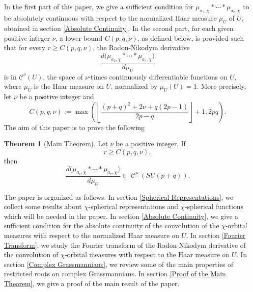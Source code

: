 \documentclass[11pt,a4paper]{amsart}
\DeclareMathOperator{\C}{\mathcal{C}}
\theoremstyle{definition}
\newtheorem*{theorem*}{Theorem}
\numberwithin{equation}{section}
\begin{document}
In the first part of this paper, we give a sufficient condition for $\mu_{a_1, \chi}\ast \cdots \ast \mu_{a_r, \chi}$ to be absolutely continuous with respect to the normalized Haar measure $\mu_U$ of $U$, obtained in section \ref{Absolute Continuity}. 
In the second part, for each given  positive integer $\nu$, a lower bound 
$C\left(p,q,\nu \right)$,  as defined below, is provided such that for every 
$r\geq C(p,q,\nu)$, the Radon-Nikodym derivative   
\[
\frac{d\big(\mu_{a_1, \chi} \ast \cdots \ast \mu_{a_r, \chi}\big)}{d\mu_U}
\]
is in $\mathcal{C}^{\nu}(U)$, the space of $\nu$-times continuously differentiable functions on $U$, where $\mu_U$ is the Haar measure on $U$, normalized by $\mu_U(U)=1$. More precisely, let $\nu$ be a positive integer and \begin{equation*}  
C\left(p,q,\nu \right):=\max\left(\left\lfloor\frac{(p+q)^2+2\nu+q(2p-1) }{2p-q}\right\rfloor+1, 2pq\right). 
\end{equation*}
The aim of this paper is to prove the following

\begin{theorem*}[Main Theorem]\label{main} 
	Let $\nu$ be a positive integer. If 
	\[
	r\geq C\left(p,q,\nu \right),
	\]
	then 
	$$
	\frac{d\big(\mu_{a_1, \chi}\ast \cdots \ast \mu_{a_r, \chi}\big)}{d\mu_U} \in \C^{\nu}\left(SU(p+q)\right).
	$$
\end{theorem*} 
The paper is organized as follows. 
In section \ref{Spherical Representations}, we collect some results about $\chi$-spherical representations and $\chi$-spherical functions which will be needed in the paper. In section \ref{Absolute Continuity}, we give a sufficient condition for the absolute continuity of the convolution of the  $\chi$-orbital measures with respect to the normalized Haar measure on $U$.
In section \ref{Fourier Transform},	we study the Fourier transform of the Radon-Nikodym derivative of the convolution of $\chi$-orbital measures with respect to the Haar measure on $U$.
In section \ref{Complex Grassmannians}, we review some of the main properties of restricted roots on complex Grassmannians.
In section \ref{Proof of the Main Theorem}, we give a proof of the main result of the paper.
\end{document}

